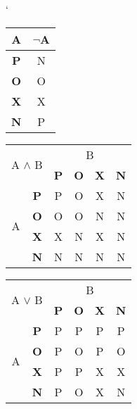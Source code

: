 \documentclass[a4paper, 11pt]{article}
\begin{document}
\begin{table}[h]
\begin{center}
    \catcode`
    \setlength{\arrayrulewidth}{0,3mm}
        \begin{tabular}{|c|c|}
            \hline
            A & $\neg$A \\
            \hline
            \textbf{P} & N \\
            \hline
            \textbf{O} & O \\
            \hline
            \textbf{X} & X \\
            \hline
            \textbf{N} & P \\ 
            \hline
        \end{tabular}
        \begin{tabular}{|c|c|c|c|c|c|}
            \hline
            \multicolumn{2}{|c|}{\multirow{2}{*}{A $\wedge$ B}} & \multicolumn{4}{c|}{B} \\
            \cline{3-6}
            \multicolumn{2}{|c|}{} & \textbf{P} & \textbf{O} & \textbf{X} & \textbf{N}\\
            \hline
                & \textbf{P} & P & O & X & N \\
            \cline{2-6} 
            \multirow{2}{*}{A} & \textbf{O} & O & O & N & N \\
            \cline{2-6} 
                & \textbf{X} & X & N & X & N \\
            \cline{2-6} 
            \multicolumn{1}{|l|}{} & \textbf{N} & N & N & N & N \\
            \hline
        \end{tabular}
        \begin{tabular}{|c|c|c|c|c|c|}
            \hline
            \multicolumn{2}{|c|}{\multirow{2}{*}{A $\vee$ B}} & \multicolumn{4}{c|}{B} \\
            \cline{3-6}
            \multicolumn{2}{|c|}{} & \textbf{P} & \textbf{O} & \textbf{X} & \textbf{N}\\
            \hline
                & \textbf{P} & P & P & P & P \\
            \cline{2-6} 
            \multirow{2}{*}{A} & \textbf{O} & P & O & P & O \\
            \cline{2-6} 
                & \textbf{X} & P & P & X & X \\
            \cline{2-6} 
            \multicolumn{1}{|l|}{} & \textbf{N} & P & O & X & N \\
            \hline
        \end{tabular}

\end{center}
\end{table}
\end{document}
